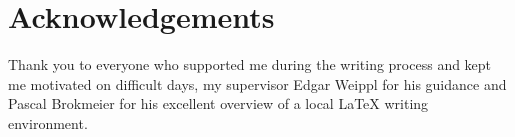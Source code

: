 \thispagestyle{empty}
\chapter{Acknowledgements}

Thank you to everyone who supported me during the writing process and kept me motivated on difficult days,
my supervisor Edgar Weippl for his guidance and Pascal Brokmeier for his excellent overview of a local \LaTeX{} 
writing environment.
\clearpage
